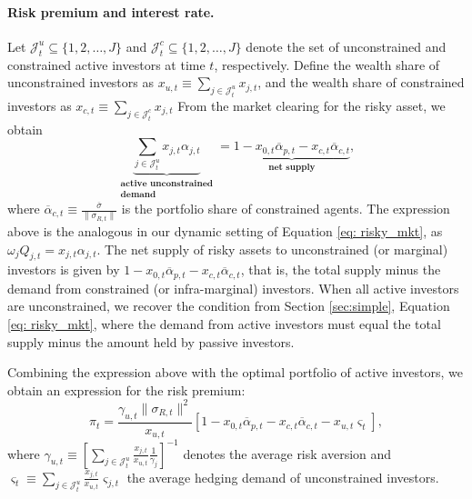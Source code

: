 \paragraph{Risk premium and interest rate.} 
Let $\mathcal{J}_t^u \subseteq \{1,2,\ldots, J\}$ and $\mathcal{J}_t^c \subseteq \{1,2,\ldots, J\}$ denote the set of unconstrained and constrained active investors at time $t$, respectively.
Define the wealth share of unconstrained investors as $x_{u,t} \equiv \sum_{j\in \mathcal{J}_t^u} x_{j,t}$, and the wealth share of constrained investors as  $x_{c,t} \equiv \sum_{j\in \mathcal{J}_t^c} x_{j,t}$
From the market clearing for the risky asset, we obtain
\begin{equation}
    \underbrace{\sum_{j \in \mathcal{J}_t^u} x_{j,t} \alpha_{j,t} }_{\substack{\textbf{active unconstrained}\\
    \textbf{demand}}} = \underbrace{1 - x_{0,t} \overline{\alpha}_{p,t} - x_{c,t} \overline{\alpha}_{c,t} }_{\textbf{net supply}},
\end{equation}
where $\overline{\alpha}_{c,t} \equiv\frac{\overline{\sigma}}{\|\sigma_{R,t}\|}$ is the portfolio share of constrained agents. 
The expression above is the analogous in our dynamic setting of Equation \eqref{eq: risky_mkt}, as $\omega_j Q_{j,t} = x_{j,t} \alpha_{j,t}$.
The net supply of risky assets to unconstrained (or marginal) investors is given by $1 - x_{0,t} \overline{\alpha}_{p,t} - x_{c,t} \overline{\alpha}_{c,t}$, that is, the total supply minus the demand from constrained (or infra-marginal) investors.
When all active investors are unconstrained, we recover the condition from Section \ref{sec:simple}, Equation \eqref{eq: risky_mkt}, where the demand from active investors must equal the total supply minus the amount held by passive investors. 


Combining the expression above with the optimal portfolio of active investors, we obtain an expression for the risk premium:
\begin{equation}\label{eq:sharpe_ratio}
    \pi_{t} =  \frac{\gamma_{u,t} \|\sigma_{R,t}\|^2}{x_{u,t}} \left[ 1 - x_{0,t} \overline{\alpha}_{p,t} - x_{c,t} \overline{\alpha}_{c,t} - x_{u,t} \varsigma_{t} \right] ,
\end{equation}
where $\gamma_{u,t} \equiv \left[ \sum_{j\in\mathcal{J}_t^u} \frac{x_{j,t}}{x_{u,t}} \frac{1}{\gamma_j}\right]^{-1}$ denotes the average risk aversion and $\varsigma_t \equiv \sum_{j\in \mathcal{J}_t^u} \frac{x_{j,t}}{x_{u,t}} \varsigma_{j,t} $ the average hedging demand of unconstrained investors.

